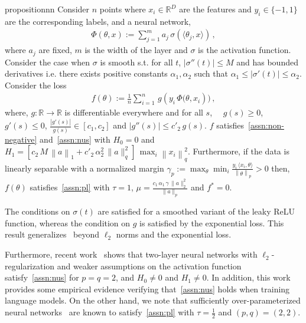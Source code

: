 \documentclass{article}
\newcommand{\normsq}[1]{\left\|#1 \right\|^{2}}
\newcommand{\norm}[1]{\left\|#1 \right\|}
\newcommand{\R}{\mathbb{R}}
\begin{document}
\begin{restatable}{proposition}{nn}
Consider $n$ points where $x_i \in \R^D$ are the features and $y_i \in \{-1,1\}$ are the corresponding labels, and a neural network,
\begin{align}
\Phi(\theta,x) := \sum_{j = 1}^m a_j \, \sigma(\langle \theta_j, x \rangle) \,,
\end{align}
where $a_j$ are fixed, $m$ is the width of the layer and $\sigma$ is the activation function. Consider the case when $\sigma$ is smooth s.t. for all $t$, $|\sigma''(t)| \leq M$ and has bounded derivatives i.e. there exists positive constants $\alpha_1, \alpha_2$ such that $\alpha_1 \leq |\sigma'(t)| \leq \alpha_2$. Consider the loss 
\begin{align}
f(\theta) := \frac{1}{n} \sum_{i = 1}^{n} \, g\left(y_i \, \Phi(\theta, x_i \right)) \,, 
\end{align}
where, $g:\R\to\R$ is differentiable everywhere and for all $s$, $\quad g(s) \geq 0$, $g'(s)\leq 0$, $\frac{|g'(s)|}{g(s)} \in [c_1, c_2]$ and $|g''(s)| \leq c'_2 \, g(s)$.  $f$ satisfies~\cref{assn:non-negative} and~\cref{assn:nus} with  $H_0 = 0$ and $H_1 = \left[c_2 \,  M \, \norm{a}_1 + c'_2 \,  \alpha_2^2 \, \|a\|_q^2 \right] \, \max_i \normsq{x_i}_{q}$. Furthermore, if the data is linearly separable with a normalized margin $\gamma_p := \max_{\theta} \min_i \frac{y_i \, \langle x_i, \theta \rangle}{\norm{\theta}_p} > 0$ then, $f(\theta)$ satisfies~\cref{assn:pl} with $\tau = 1$, $\mu = \frac{c_1 \, \alpha_1 \, \gamma \, \|a\|_2^2}{\|a\|_p}$ and $f^* = 0$. 
\label{prop:nn} 
\end{restatable}
\vspace{-1ex}
The conditions on $\sigma(t)$ are satisfied for a smoothed variant of the leaky ReLU function, whereas the condition on $g$ is satisfied by the exponential loss. This result generalizes~\citet[Lemmas 3 \& 5]{taheri2023fast} beyond $\ell_2$ norms and the exponential loss.

Furthermore, recent work~\citep[Proposition 3.3]{alimisis2025we} shows that two-layer neural networks with $\ell_2$-regularization and weaker assumptions on the activation function satisfy~\cref{assn:nus} for $p = q = 2$, and $H_0 \neq 0$ and $H_1 \neq 0$. In addition, this work provides some empirical evidence verifying that~\cref{assn:nus} holds when training language models. On the other hand, we note that sufficiently over-parameterized neural networks~\citep{liu2022loss,soltanolkotabi2018theoretical,zou2019improved,li2018learning} are known to satisfy~\cref{assn:pl} with $\tau = \frac{1}{2}$ and $(p,q) = (2,2)$. 
\end{document}
